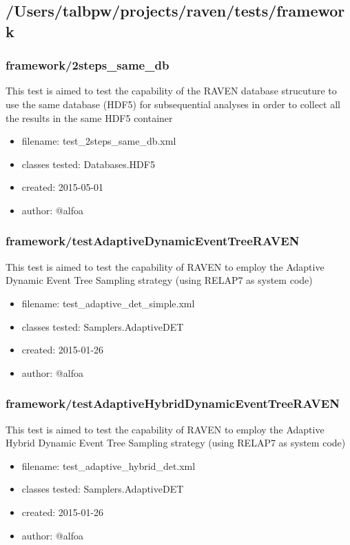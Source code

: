   \subsection{/Users/talbpw/projects/raven/tests/framework}
    \subsubsection{framework/2steps\_same\_db}
      
        This  test is aimed to test the capability of the RAVEN database strucuture to use the same database (HDF5) for
        subsequential analyses in order to collect all the results in the same HDF5 container
    
      \begin{itemize}
          \item filename: test\_2steps\_same\_db.xml
          \item classes tested: Databases.HDF5
          \item created: 2015-05-01
          \item author: @alfoa
      \end{itemize}
    \subsubsection{framework/testAdaptiveDynamicEventTreeRAVEN}
      
        This  test is aimed to test the capability of RAVEN to employ the Adaptive Dynamic Event Tree Sampling strategy (using RELAP7 as system code)
    
      \begin{itemize}
          \item filename: test\_adaptive\_det\_simple.xml
          \item classes tested: Samplers.AdaptiveDET
          \item created: 2015-01-26
          \item author: @alfoa
      \end{itemize}
    \subsubsection{framework/testAdaptiveHybridDynamicEventTreeRAVEN}
      
        This  test is aimed to test the capability of RAVEN to employ the Adaptive Hybrid Dynamic Event Tree Sampling strategy (using RELAP7 as system code)
    
      \begin{itemize}
          \item filename: test\_adaptive\_hybrid\_det.xml
          \item classes tested: Samplers.AdaptiveDET
          \item created: 2015-01-26
          \item author: @alfoa
      \end{itemize}
